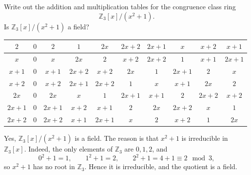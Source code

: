 \begin{problem}{
    Write out the addition and multiplication tables for the congruence class ring
    \[
        \mathbb{Z}_3[x]/(x^2+1).
    \]
    Is $\mathbb{Z}_3[x]/(x^2+1)$ a field?
}
\begin{center}
\begin{tabular}{|c|c|c|c|c|c|c|c|c|c|}
            $2$ & $0$ & $2$ & $1$ & $2x$ & $2x+2$ & $2x+1$ & $x$ & $x+2$ & $x+1$ \\ \hline
            $x$ & $0$ & $x$ & $2x$ & $2$ & $x+2$ & $2x+2$ & $1$ & $x+1$ & $2x+1$ \\ \hline
            $x+1$ & $0$ & $x+1$ & $2x+2$ & $x+2$ & $2x$ & $1$ & $2x+1$ & $2$ & $x$ \\ \hline
            $x+2$ & $0$ & $x+2$ & $2x+1$ & $2x+2$ & $1$ & $x$ & $x+1$ & $2x$ & $2$ \\ \hline
            $2x$ & $0$ & $2x$ & $x$ & $1$ & $2x+1$ & $x+1$ & $2$ & $2x+2$ & $x+2$ \\ \hline
            $2x+1$ & $0$ & $2x+1$ & $x+2$ & $x+1$ & $2$ & $2x$ & $2x+2$ & $x$ & $1$ \\ \hline
            $2x+2$ & $0$ & $2x+2$ & $x+1$ & $2x+1$ & $x$ & $2$ & $x+2$ & $1$ & $2x$ \\ \hline
        \end{tabular}
    \end{center}
    Yes, $\mathbb{Z}_3[x]/(x^2+1)$ is a field.
    The reason is that $x^2+1$ is irreducible in $\mathbb{Z}_3[x]$.
    Indeed, the only elements of $\mathbb{Z}_3$ are $0,1,2$, and
    \[
        0^2+1=1,\qquad 1^2+1=2,\qquad 2^2+1=4+1\equiv 2 \mod 3,
    \]
    so $x^2+1$ has no root in $\mathbb{Z}_3$.
    Hence it is irreducible, and the quotient is a field.
\end{problem}

